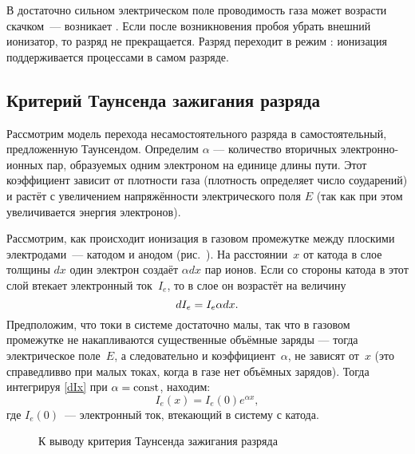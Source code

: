 \begin{labsupplement}
В достаточно сильном электрическом поле проводимость газа может возрасти
скачком~--- возникает .
Если после возникновения пробоя убрать внешний ионизатор, то разряд не
прекращается. Разряд переходит в режим :
ионизация поддерживается процессами в самом разряде.

\subsection*{Критерий Таунсенда зажигания разряда}
Рассмотрим модель перехода несамостоятельного разряда в самостоятельный,
предложенную Таунсендом.
Определим  $\alpha$ ---
количество вторичных электронно-ионных пар, образуемых одним электроном
на единице длины пути.
Этот коэффициент зависит от плотности газа
(плотность определяет число соударений)
и растёт с увеличением напряжённости электрического поля $E$
(так как при этом увеличивается энергия электронов).

Рассмотрим, как происходит ионизация в газовом промежутке между плоскими
электродами~--- катодом и анодом (рис.~). На
расстоянии~$x$ от катода в слое толщины $dx$ один электрон создаёт $\alpha dx$
пар ионов. Если со стороны катода в этот
слой втекает электронный ток~$I_e$, то в слое он возрастёт на величину
\begin{equation}
\eqmark{dIx}
dI_e=I_e\alpha dx.
\end{equation}
Предположим, что токи в системе достаточно малы, так что в газовом промежутке
не накапливаются существенные объёмные заряды --- тогда электрическое поле~$E$,
а следовательно и коэффициент~$\alpha$, не зависят от~$x$
(это справедливво при малых токах, когда в газе нет объёмных зарядов).
Тогда интегрируя \eqref{dIx} при $\alpha=\mathrm{const}$, находим:
\begin{equation*}
	I_e(x)=I_e(0)e^{\alpha x},
\end{equation*}
где $I_e(0)$~--- электронный ток, втекающий в систему с катода.

\begin{wrapfigure}{o}{0.3\textwidth}
    \centering
    \caption{К выводу критерия Таунсенда зажигания разряда}
\end{wrapfigure}


\end{labsupplement}
